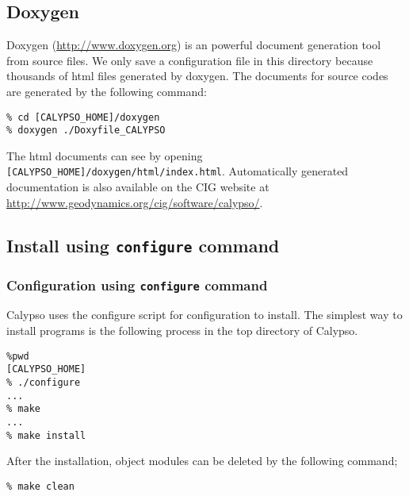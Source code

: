 
\subsection{Doxygen}
Doxygen (\url{http://www.doxygen.org}) is an powerful document generation tool from source files. We only save a configuration file in this directory because thousands of html files generated by doxygen. The documents for source codes are generated by the following command:
% 
\begin{verbatim}
% cd [CALYPSO_HOME]/doxygen
% doxygen ./Doxyfile_CALYPSO
\end{verbatim}
%
The html documents can see by opening \verb|[CALYPSO_HOME]/doxygen/html/index.html|.  Automatically generated documentation is also available on the CIG website at \url{http://www.geodynamics.org/cig/software/calypso/}.

\subsection{Install using {\tt configure} command }
\subsubsection{Configuration using {\tt configure} command }
Calypso uses the configure script for configuration to install. The simplest way to install programs is the following process in the top directory of Calypso.
% 
\begin{verbatim}
%pwd
[CALYPSO_HOME]
% ./configure
...
% make
...
% make install
\end{verbatim}
%
After the installation, object modules can be deleted by the following command;
% 
\begin{verbatim}
% make clean
\end{verbatim}
%

